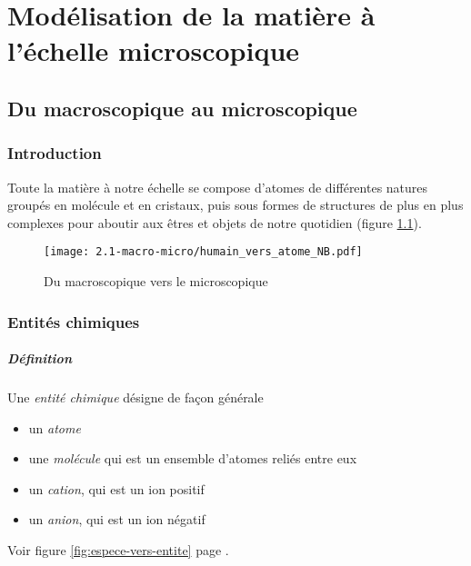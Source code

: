 
\chapter{Modélisation de la matière à l'échelle microscopique}



\section{Du macroscopique au microscopique}
\subsection{Introduction}
Toute la matière à notre échelle se compose d'atomes de différentes natures
groupés en molécule et en cristaux, puis sous formes de structures de plus en plus
complexes pour aboutir aux êtres et objets de notre quotidien (figure \ref{fig:macro-vers-micro}).
\begin{figure}[!h]
  \begin{center}
      \texttt{[image: 2.1-macro-micro/humain\_vers\_atome\_NB.pdf]}
  \end{center}
  \caption{Du macroscopique vers le microscopique}
  \label{fig:macro-vers-micro}
\end{figure}

\subsection{Entités chimiques}
\paragraph{Définition} Une \textit{entité chimique} désigne de façon
générale
\begin{itemize}
 \item un \textit{atome}
 \item une \textit{molécule} qui est un ensemble d'atomes reliés entre eux
 \item un \textit{cation}, qui est un ion positif
 \item un \textit{anion}, qui est un ion négatif
\end{itemize}
Voir figure \ref{fig:espece-vers-entite} page \pageref{fig:espece-vers-entite}.
